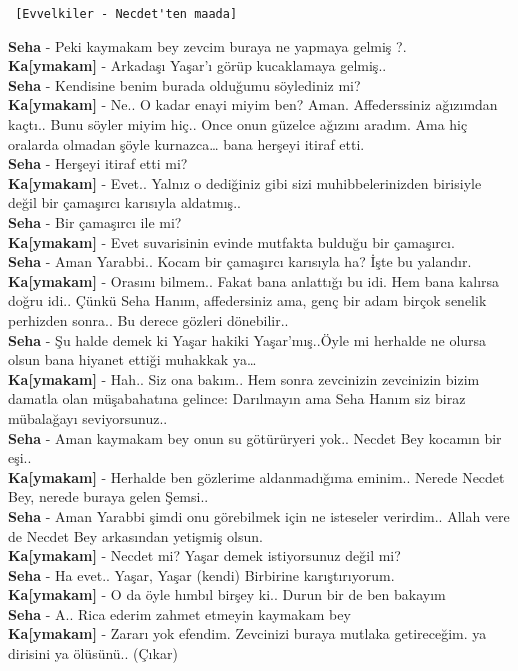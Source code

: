 \documentclass[]{book}
\begin{document}
\begin{verbatim}
 [Evvelkiler - Necdet'ten maada]
\end{verbatim}

\textbf{Seha} - Peki kaymakam bey zevcim buraya ne yapmaya gelmiş ?.\\
\textbf{Ka{[}ymakam{]}} - Arkadaşı Yaşar'ı görüp kucaklamaya gelmiş..\\
\textbf{Seha} - Kendisine benim burada olduğumu söylediniz mi?\\
\textbf{Ka{[}ymakam{]}} - Ne.. O kadar enayi miyim ben? Aman. Affederssiniz ağızımdan kaçtı.. Bunu söyler miyim hiç.. Once onun güzelce ağızını aradım. Ama hiç oralarda olmadan şöyle kurnazca\ldots{} bana herşeyi itiraf etti.\\
\textbf{Seha} - Herşeyi itiraf etti mi?\\
\textbf{Ka{[}ymakam{]}} - Evet.. Yalnız o dediğiniz gibi sizi muhibbelerinizden birisiyle değil bir çamaşırcı karısıyla aldatmış..\\
\textbf{Seha} - Bir çamaşırcı ile mi?\\
\textbf{Ka{[}ymakam{]}} - Evet suvarisinin evinde mutfakta bulduğu bir çamaşırcı.\\
\textbf{Seha} - Aman Yarabbi.. Kocam bir çamaşırcı karısıyla ha? İşte bu yalandır.\\
\textbf{Ka{[}ymakam{]}} - Orasını bilmem.. Fakat bana anlattığı bu idi. Hem bana kalırsa doğru idi.. Çünkü Seha Hanım, affedersiniz ama, genç bir adam birçok senelik perhizden sonra.. Bu derece gözleri dönebilir..\\
\textbf{Seha} - Şu halde demek ki Yaşar hakiki Yaşar'mış..Öyle mi herhalde ne olursa olsun bana hiyanet ettiği muhakkak ya\ldots{}\\
\textbf{Ka{[}ymakam{]}} - Hah.. Siz ona bakım.. Hem sonra zevcinizin zevcinizin bizim damatla olan müşabahatına gelince: Darılmayın ama Seha Hanım siz biraz mübalağayı seviyorsunuz..\\
\textbf{Seha} - Aman kaymakam bey onun su götürüryeri yok.. Necdet Bey kocamın bir eşi..\\
\textbf{Ka{[}ymakam{]}} - Herhalde ben gözlerime aldanmadığıma eminim.. Nerede Necdet Bey, nerede buraya gelen Şemsi..\\
\textbf{Seha} - Aman Yarabbi şimdi onu görebilmek için ne isteseler verirdim.. Allah vere de Necdet Bey arkasından yetişmiş olsun.\\
\textbf{Ka{[}ymakam{]}} - Necdet mi? Yaşar demek istiyorsunuz değil mi?\\
\textbf{Seha} - Ha evet.. Yaşar, Yaşar (kendi) Birbirine karıştırıyorum.\\
\textbf{Ka{[}ymakam{]}} - O da öyle hımbıl birşey ki.. Durun bir de ben bakayım\\
\textbf{Seha} - A.. Rica ederim zahmet etmeyin kaymakam bey\\
\textbf{Ka{[}ymakam{]}} - Zararı yok efendim. Zevcinizi buraya mutlaka getireceğim. ya dirisini ya ölüsünü.. (Çıkar)\\
\end{document}
